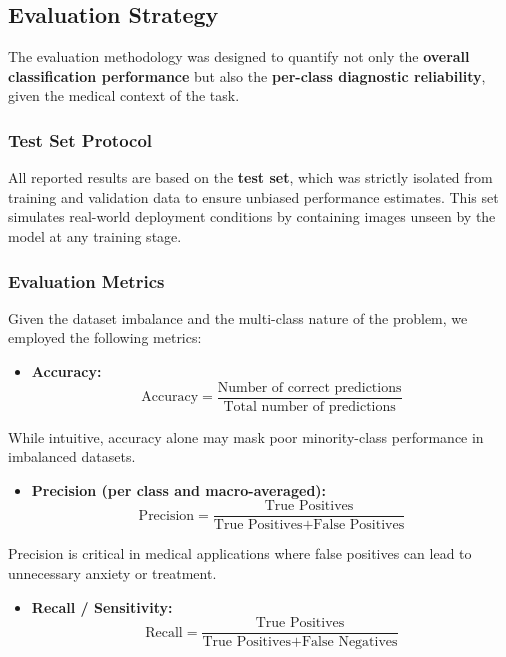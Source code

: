 \documentclass[
  12pt,
  oneside]{article}
\providecommand{\tightlist}{%
  \setlength{\itemsep}{0pt}\setlength{\parskip}{0pt}}
\begin{document}
\subsection{Evaluation Strategy}\label{evaluation-strategy}

The evaluation methodology was designed to quantify not only the
\textbf{overall classification performance} but also the
\textbf{per-class diagnostic reliability}, given the medical context of
the task.

\subsubsection{Test Set Protocol}\label{test-set-protocol}

All reported results are based on the \textbf{test set}, which was
strictly isolated from training and validation data to ensure unbiased
performance estimates. This set simulates real-world deployment
conditions by containing images unseen by the model at any training
stage.

\subsubsection{Evaluation Metrics}\label{evaluation-metrics}

Given the dataset imbalance and the multi-class nature of the problem,
we employed the following metrics:

\begin{itemize}
\tightlist
\item
  \textbf{Accuracy:} \[
  \text{Accuracy} = \frac{\text{Number of correct predictions}}{\text{Total number of predictions}}
  \]
\end{itemize}

While intuitive, accuracy alone may mask poor minority-class performance
in imbalanced datasets.

\begin{itemize}
\tightlist
\item
  \textbf{Precision (per class and macro-averaged):} \[
  \text{Precision} = \frac{\text{True Positives}}{\text{True Positives} + \text{False Positives}}
  \]
\end{itemize}

Precision is critical in medical applications where false positives can
lead to unnecessary anxiety or treatment.

\begin{itemize}
\tightlist
\item
  \textbf{Recall / Sensitivity:} \[
  \text{Recall} = \frac{\text{True Positives}}{\text{True Positives} + \text{False Negatives}}
  \]
\end{itemize}
\end{document}
